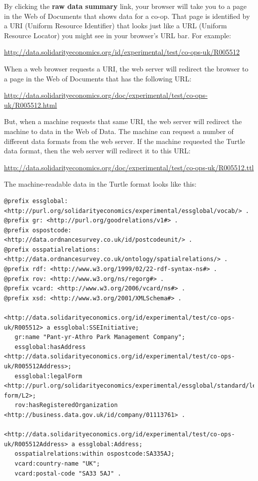 \geek By clicking the \textbf{raw data summary} link, your browser will take you to a page in the Web of Documents that shows data for a co-op. 
That page is identified by a URI (Uniform Resource Identifier) that looks just like a URL (Uniform Resource Locator) you might see in your browser's URL bar. For example:

{\footnotesize \url{http://data.solidarityeconomics.org/id/experimental/test/co-ops-uk/R005512}}

\geek When a web browser requests a URI, the web server will redirect the browser to a page in the Web of Documents that has the following URL:

{\footnotesize \url{http://data.solidarityeconomics.org/doc/experimental/test/co-ops-uk/R005512.html}}

\geek But, when a machine requests that same URI, the web server will redirect the machine to data in the Web of Data. 
The machine can request a number of different data formats from the web server.
If the machine requested the Turtle data format, then the web server will redirect it to this URL:

{\footnotesize \url{http://data.solidarityeconomics.org/doc/experimental/test/co-ops-uk/R005512.ttl}}

\geek The machine-readable data in the Turtle format looks like this:

{\footnotesize
\begin{verbatim}
@prefix essglobal: <http://purl.org/solidarityeconomics/experimental/essglobal/vocab/> .
@prefix gr: <http://purl.org/goodrelations/v1#> .
@prefix ospostcode: <http://data.ordnancesurvey.co.uk/id/postcodeunit/> .
@prefix osspatialrelations: <http://data.ordnancesurvey.co.uk/ontology/spatialrelations/> .
@prefix rdf: <http://www.w3.org/1999/02/22-rdf-syntax-ns#> .
@prefix rov: <http://www.w3.org/ns/regorg#> .
@prefix vcard: <http://www.w3.org/2006/vcard/ns#> .
@prefix xsd: <http://www.w3.org/2001/XMLSchema#> .

<http://data.solidarityeconomics.org/id/experimental/test/co-ops-uk/R005512> a essglobal:SSEInitiative;
   gr:name "Pant-yr-Athro Park Management Company";
   essglobal:hasAddress <http://data.solidarityeconomics.org/id/experimental/test/co-ops-uk/R005512Address>;
   essglobal:legalForm <http://purl.org/solidarityeconomics/experimental/essglobal/standard/legal-form/L2>;
   rov:hasRegisteredOrganization <http://business.data.gov.uk/id/company/01113761> .

<http://data.solidarityeconomics.org/id/experimental/test/co-ops-uk/R005512Address> a essglobal:Address;
   osspatialrelations:within ospostcode:SA335AJ;
   vcard:country-name "UK";
   vcard:postal-code "SA33 5AJ" .
\end{verbatim}
}

